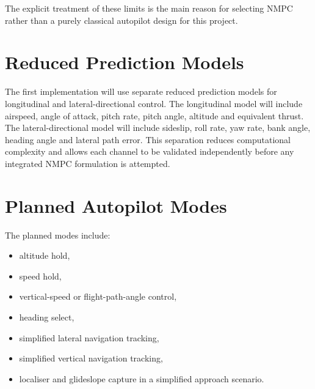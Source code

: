 The explicit treatment of these limits is the main reason for selecting NMPC rather than a purely classical autopilot design for this project.

\section{Reduced Prediction Models}

The first implementation will use separate reduced prediction models for longitudinal and lateral-directional control. The longitudinal model will include airspeed, angle of attack, pitch rate, pitch angle, altitude and equivalent thrust. The lateral-directional model will include sideslip, roll rate, yaw rate, bank angle, heading angle and lateral path error. This separation reduces computational complexity and allows each channel to be validated independently before any integrated NMPC formulation is attempted.

\section{Planned Autopilot Modes}

The planned modes include:
\begin{itemize}
    \item altitude hold,
    \item speed hold,
    \item vertical-speed or flight-path-angle control,
    \item heading select,
    \item simplified lateral navigation tracking,
    \item simplified vertical navigation tracking,
    \item localiser and glideslope capture in a simplified approach scenario.
\end{itemize}
